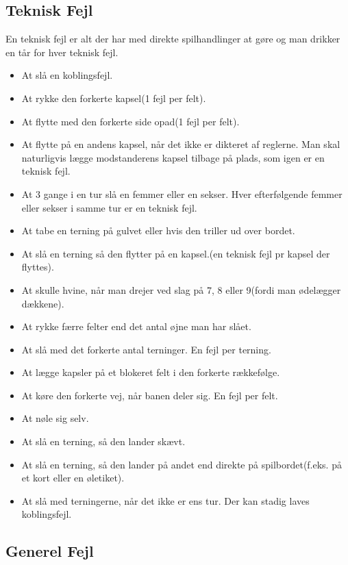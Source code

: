 \documentclass[12pt]{article}
\begin{document}
\subsection*{Teknisk Fejl}

En teknisk fejl er alt der har med direkte spilhandlinger at gøre og man drikker en tår for hver teknisk fejl.

\begin{itemize}
	\item At slå en koblingsfejl.
	\item At rykke den forkerte kapsel(1 fejl per felt).
	\item At flytte med den forkerte side opad(1 fejl per felt).
	\item At flytte på en andens kapsel, når det ikke er dikteret af reglerne. Man skal naturligvis lægge modstanderens kapsel tilbage på plads, som igen er en teknisk fejl.
	\item At 3 gange i en tur slå en femmer eller en sekser. Hver efterfølgende femmer eller sekser i samme tur er en teknisk fejl.
	\item At tabe en terning på gulvet eller hvis den triller ud over bordet.
	\item At slå en terning så den flytter på en kapsel.(en teknisk fejl pr kapsel der flyttes).
	\item At skulle hvine, når man drejer ved slag på 7, 8 eller 9(fordi man ødelægger dækkene).
	\item At rykke færre felter end det antal øjne man har slået.
	\item At slå med det forkerte antal terninger. En fejl per terning.
	\item At lægge kapsler på et blokeret felt i den forkerte rækkefølge.
	\item At køre den forkerte vej, når banen deler sig. En fejl per felt.
	\item At nøle sig selv.
	\item At slå en terning, så den lander skævt.
	\item At slå en terning, så den lander på andet end direkte på spilbordet(f.eks. på et kort eller en øletiket).
	\item At slå med terningerne, når det ikke er ens tur. Der kan stadig laves koblingsfejl.
\end{itemize}

\subsection*{Generel Fejl}
\end{document}

